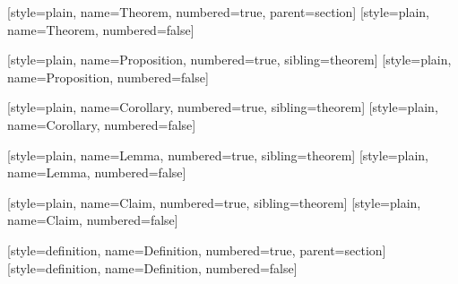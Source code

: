 
\usepackage{amsmath,amsthm,amssymb}
\usepackage{mathtools}
\usepackage{mathrsfs}
\usepackage{bm}
\usepackage{extarrows}
\usepackage[a4paper, margin=1in]{geometry}
\usepackage{float}
\usepackage{indentfirst}
\usepackage{booktabs,multirow}
\usepackage[shortlabels,inline]{enumitem}
\usepackage{appendix}

\usepackage[dvipsnames]{xcolor}
\usepackage{pifont}
\usepackage{graphicx}
\graphicspath{
    {./figure/}{./figures/}{./image/}{./images/}{./graphic/}{./graphics/}{./picture/}{./pictures/}
}
\usepackage{subcaption}

\usepackage[ruled,linesnumbered,noline]{algorithm2e}
\usepackage{listings}
\lstset{style=simpleStyle}

\usepackage{hyperref}
\hypersetup{
    colorlinks=true,linkcolor=,urlcolor=cyan
}

\renewcommand*{\proofname}{\normalfont\bfseries Proof}

\usepackage{keytheorems}


[style=plain, name=Theorem, numbered=true, parent=section]
[style=plain, name=Theorem, numbered=false]

[style=plain, name=Proposition, numbered=true, sibling=theorem]
[style=plain, name=Proposition, numbered=false]

[style=plain, name=Corollary, numbered=true, sibling=theorem]
[style=plain, name=Corollary, numbered=false]

[style=plain, name=Lemma, numbered=true, sibling=theorem]
[style=plain, name=Lemma, numbered=false]

[style=plain, name=Claim, numbered=true, sibling=theorem]
[style=plain, name=Claim, numbered=false]

[style=definition, name=Definition, numbered=true, parent=section]
[style=definition, name=Definition, numbered=false]

